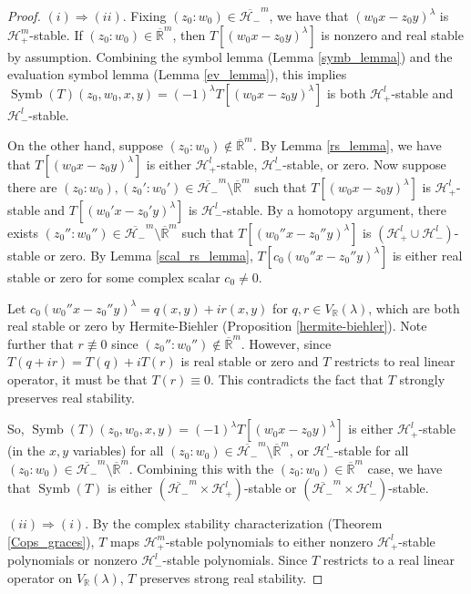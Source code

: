 \documentclass{article}
\theoremstyle{definition}
\theoremstyle{plain}
\newcommand{\R}{\mathbb{R}}
\newcommand{\UHP}{\mathcal{H}_+}
\newcommand{\LHP}{\mathcal{H}_-}
\DeclareMathOperator{\Symb}{Symb}
\begin{document}
\begin{proof}
    $(i) \Rightarrow (ii)$. Fixing $(z_0:w_0) \in \overline{\LHP}^m$, we have that $(w_0x - z_0y)^\lambda$ is $\UHP^m$-stable. If $(z_0:w_0) \in \overline{\R}^m$, then $T[(w_0x - z_0y)^\lambda]$ is nonzero and real stable by assumption. Combining the symbol lemma (Lemma \ref{symb_lemma}) and the evaluation symbol lemma (Lemma \ref{ev_lemma}), this implies $\Symb(T)(z_0,w_0,x,y) = (-1)^\lambda T[(w_0x - z_0y)^\lambda]$ is both $\UHP^l$-stable and $\LHP^l$-stable.
    
    On the other hand, suppose $(z_0:w_0) \not\in \overline{\R}^m$. By Lemma \ref{rs_lemma}, we have that $T[(w_0x - z_0y)^\lambda]$ is either $\UHP^l$-stable, $\LHP^l$-stable, or zero. Now suppose there are $(z_0:w_0), (z_0':w_0') \in \overline{\LHP}^m \setminus \overline{\R}^m$ such that $T[(w_0x - z_0y)^\lambda]$ is $\UHP^l$-stable and $T[(w_0'x - z_0'y)^\lambda]$ is $\LHP^l$-stable. By a homotopy argument, there exists $(z_0'':w_0'') \in \overline{\LHP}^m \setminus \overline{\R}^m$ such that $T[(w_0''x - z_0''y)^\lambda]$ is $(\UHP^l \cup \LHP^l)$-stable or zero. By Lemma \ref{scal_rs_lemma}, $T[c_0(w_0''x - z_0''y)^\lambda]$ is either real stable or zero for some complex scalar $c_0 \neq 0$.

    Let $c_0(w_0''x - z_0''y)^\lambda = q(x,y) + ir(x,y)$ for $q,r \in V_\R(\lambda)$, which are both real stable or zero by Hermite-Biehler (Proposition \ref{hermite-biehler}). Note further that $r \not\equiv 0$ since $(z_0'':w_0'') \not\in \overline{\R}^m$. However, since $T(q + ir) = T(q) + iT(r)$ is real stable or zero and $T$ restricts to real linear operator, it must be that $T(r) \equiv 0$. This contradicts the fact that $T$ strongly preserves real stability.
    
    So, $\Symb(T)(z_0,w_0,x,y) = (-1)^\lambda T[(w_0x - z_0y)^\lambda]$ is either $\UHP^l$-stable (in the $x,y$ variables) for all $(z_0:w_0) \in \overline{\LHP}^m \setminus \overline{\R}^m$, or $\LHP^l$-stable for all $(z_0:w_0) \in \overline{\LHP}^m \setminus \overline{\R}^m$. Combining this with the $(z_0:w_0) \in \overline{\R}^m$ case, we have that $\Symb(T)$ is either $(\overline{\LHP}^m \times \UHP^l)$-stable or $(\overline{\LHP}^m \times \LHP^l)$-stable.
    
    $(ii) \Rightarrow (i)$. By the complex stability characterization (Theorem \ref{Cops_graces}), $T$ maps $\UHP^m$-stable polynomials to either nonzero $\UHP^l$-stable polynomials or nonzero $\LHP^l$-stable polynomials. Since $T$ restricts to a real linear operator on $V_\R(\lambda)$, $T$ preserves strong real stability.
\end{proof}
\end{document}
